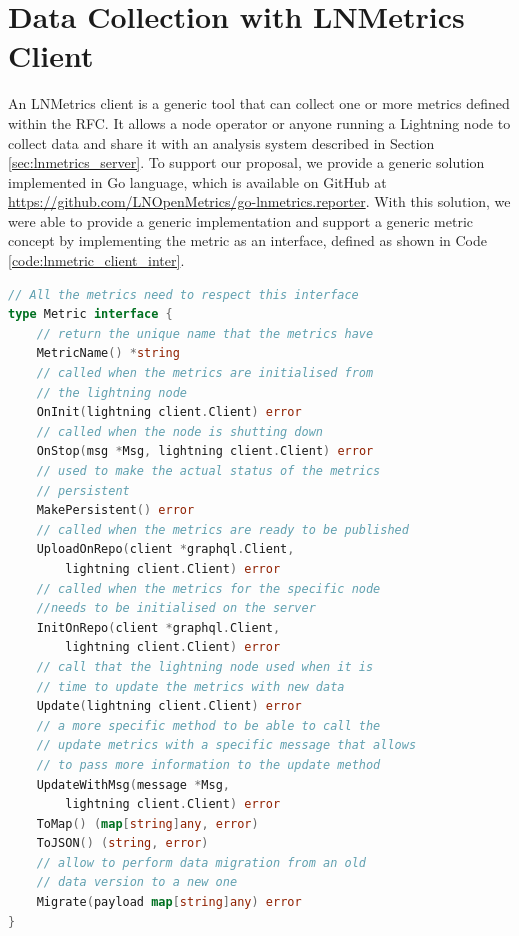 \section{Data Collection with LNMetrics Client}
\label{sec:lnmetrics_client}

An LNMetrics client is a generic tool that can collect one or more metrics
defined within the RFC. It allows a node operator or anyone running a Lightning
node to collect data and share it with an analysis system described in 
Section \ref{sec:lnmetrics_server}. To support our proposal, we provide a
generic solution implemented in Go language, which is available on GitHub
at \url{https://github.com/LNOpenMetrics/go-lnmetrics.reporter}. With this
solution, we were able to provide a generic implementation and support a 
generic metric concept by implementing the metric as an interface, defined
as shown in Code \ref{code:lnmetric_client_inter}.

\begin{lstlisting}[language=go, basicstyle=\small,
                  caption={Metric interface provided in our client reference implementation.}, 
                  label={code:lnmetric_client_inter}]
// All the metrics need to respect this interface
type Metric interface {
    // return the unique name that the metrics have
    MetricName() *string
    // called when the metrics are initialised from 
    // the lightning node
    OnInit(lightning client.Client) error
    // called when the node is shutting down
    OnStop(msg *Msg, lightning client.Client) error
    // used to make the actual status of the metrics
    // persistent
    MakePersistent() error
    // called when the metrics are ready to be published
    UploadOnRepo(client *graphql.Client, 
        lightning client.Client) error
    // called when the metrics for the specific node 
    //needs to be initialised on the server
    InitOnRepo(client *graphql.Client, 
        lightning client.Client) error
    // call that the lightning node used when it is 
    // time to update the metrics with new data
    Update(lightning client.Client) error
    // a more specific method to be able to call the 
    // update metrics with a specific message that allows 
    // to pass more information to the update method
    UpdateWithMsg(message *Msg, 
        lightning client.Client) error
    ToMap() (map[string]any, error)
    ToJSON() (string, error)
    // allow to perform data migration from an old 
    // data version to a new one
    Migrate(payload map[string]any) error
}
\end{lstlisting}

